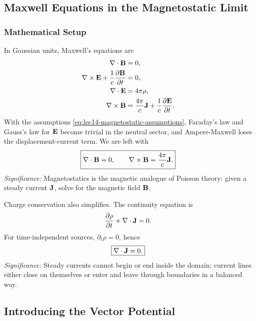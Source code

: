 \subsection{Maxwell Equations in the Magnetostatic Limit}\label{subsec:lec14-maxwell-limit}

\subsubsection*{Mathematical Setup}
In Gaussian units, Maxwell's equations are
\begin{align}
  \nabla \cdot\mathbf{B} &= 0, \label{eq:lec14-maxwell-divB}\\
  \nabla\times\mathbf{E} + \frac{1}{c}\frac{\partial\mathbf{B}}{\partial t} &= 0, \label{eq:lec14-maxwell-faraday}\\
  \nabla \cdot\mathbf{E} &= 4\pi\rho, \label{eq:lec14-maxwell-gaussE}\\
  \nabla\times\mathbf{B} &= \frac{4\pi}{c}\mathbf{J}
    + \frac{1}{c}\frac{\partial\mathbf{E}}{\partial t}. \label{eq:lec14-maxwell-ampere}
\end{align}
With the assumptions \eqref{eq:lec14-magnetostatic-assumptions}, Faraday's law and
Gauss's law for $\mathbf{E}$ become trivial in the neutral sector, and Ampere-Maxwell loses
the displacement-current term.  We are left with
\begin{equation}\label{eq:lec14-magnetostatic-equations}
  \boxed{
    \nabla \cdot\mathbf{B} = 0,\qquad
    \nabla\times\mathbf{B} = \frac{4\pi}{c}\mathbf{J} .
  }
\end{equation}
\textit{Significance:} Magnetostatics is the magnetic analogue of Poisson theory:
given a steady current $\mathbf{J}$, solve for the magnetic field $\mathbf{B}$.

Charge conservation also simplifies.  The continuity equation is
\begin{equation}\label{eq:lec14-continuity-full}
  \frac{\partial\rho}{\partial t}+\nabla \cdot\mathbf{J}=0.
\end{equation}
For time-independent sources, $\partial_t\rho=0$, hence
\begin{equation}\label{eq:lec14-current-conservation}
  \boxed{\nabla \cdot\mathbf{J}=0.}
\end{equation}
\textit{Significance:} Steady currents cannot begin or end inside the domain; current
lines either close on themselves or enter and leave through boundaries in a balanced way.

\subsection{Introducing the Vector Potential}\label{subsec:lec14-vector-potential}

